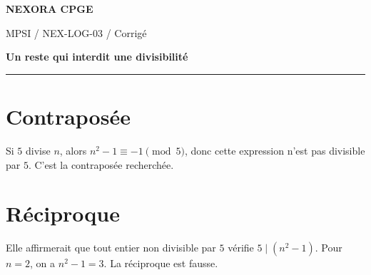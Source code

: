 \documentclass[11pt,a4paper]{article}
\begin{document}
{\small\bfseries\color{nexorablue} NEXORA CPGE}\par
{\small MPSI / NEX-LOG-03 / Corrigé}\par
{\LARGE\bfseries Un reste qui interdit une divisibilité}\par
\vspace{0.25em}\hrule\vspace{0.6em}

\section*{Contraposée}
Si $5$ divise $n$, alors $n^2-1\equiv-1\pmod5$, donc cette expression n’est pas divisible par $5$. C’est la contraposée recherchée.

\section*{Réciproque}
Elle affirmerait que tout entier non divisible par $5$ vérifie $5\mid(n^2-1)$. Pour $n=2$, on a $n^2-1=3$. La réciproque est fausse.
\end{document}
